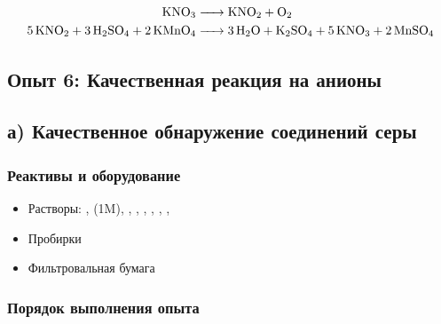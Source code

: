 \documentclass[a4paper, 12pt]{article}
\begin{document}
\begin{align}
	\ce{KNO3 &-> KNO2 + O2}\\
	\ce{5 KNO2 + 3 H2SO4 + 2 KMnO4 &-> 3 H2O + K2SO4 + 5 KNO3 + 2 MnSO4}
\end{align}

\subsection{Опыт 6: Качественная реакция на анионы}

\subsection*{а) Качественное обнаружение соединений серы}
\subsubsection{Реактивы и оборудование}

\begin{itemize}
	\item Растворы: ,  (1M), , , , , , , 
	
	\item Пробирки
	
	\item Фильтровальная бумага
\end{itemize}

\subsubsection{Порядок выполнения опыта}
\end{document}
